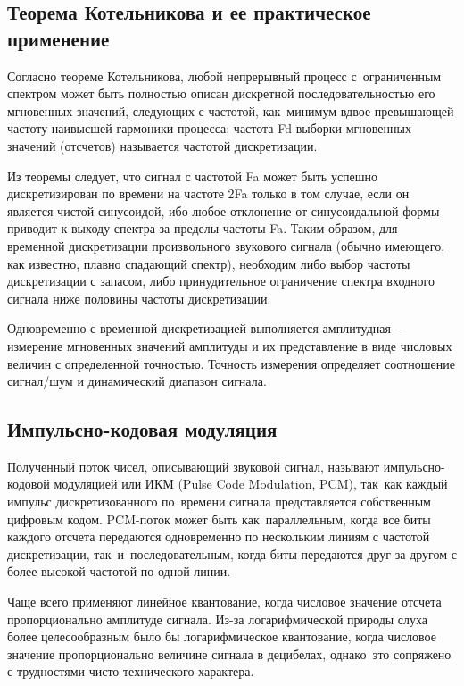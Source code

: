 \documentclass{ou}
\begin{document}
\subsection{Теорема Котельникова и ее практическое применение}
Согласно теореме Котельникова, любой непрерывный процесс с~ограниченным спектром может быть полностью описан дискретной последовательностью его мгновенных значений, следующих с частотой, как~минимум вдвое превышающей частоту наивысшей гармоники процесса; частота Fd выборки мгновенных значений (отсчетов) называется частотой дискретизации.

Из теоремы следует, что сигнал с частотой Fa может быть успешно дискретизирован по времени на частоте 2Fa только в том случае, если он является чистой синусоидой, ибо любое отклонение от синусоидальной формы приводит к выходу спектра за пределы частоты Fa. Таким образом, для временной дискретизации произвольного звукового сигнала (обычно имеющего, как известно, плавно спадающий спектр), необходим либо выбор частоты дискретизации с запасом, либо принудительное ограничение спектра входного сигнала ниже половины частоты дискретизации.

Одновременно с временной дискретизацией выполняется амплитудная -- измерение мгновенных значений амплитуды и их представление в виде числовых величин с определенной точностью. Точность измерения определяет соотношение сигнал/шум и динамический диапазон сигнала\cite{ixbt}.
\subsection{Импульсно-кодовая модуляция}
Полученный поток чисел, описывающий звуковой сигнал, называют импульсно-кодовой модуляцией или ИКМ (Pulse Code Modulation, PCM), так~как каждый импульс дискретизованного по~времени сигнала представляется собственным цифровым кодом. PCM-поток может быть как~параллельным, когда все биты каждого отсчета передаются одновременно по нескольким линиям с частотой дискретизации, так~и~последовательным, когда биты передаются друг за другом с более высокой частотой по одной линии.

Чаще всего применяют линейное квантование, когда числовое значение отсчета пропорционально амплитуде сигнала. Из-за логарифмической природы слуха более целесообразным было бы логарифмическое квантование, когда числовое значение пропорционально величине сигнала в децибелах, однако~это сопряжено с трудностями чисто технического характера\cite{3dnews}.
\end{document}
